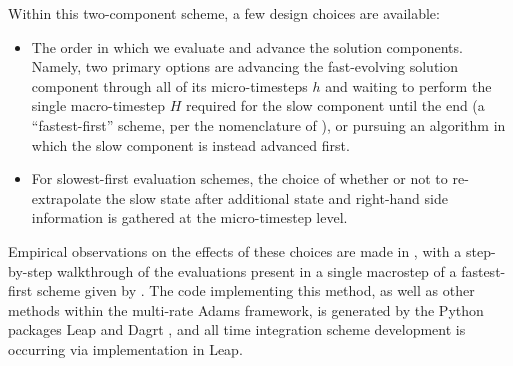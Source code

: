Within this two-component scheme, a few design choices are available:
\begin{itemize}
\item The order in which we evaluate and advance the solution components.
	Namely, two primary options are advancing the fast-evolving solution
	component through all of its micro-timesteps $h$ and waiting to perform
	the single macro-timestep $H$ required for the slow component until the
	end (a ``fastest-first'' scheme, per the nomenclature of
	\cite{gear1984multirate}), or pursuing an algorithm in which the slow
	component is instead advanced first.
\item For slowest-first evaluation schemes, the choice of whether or not to
	re-extrapolate the slow state after additional state and right-hand
	side information is gathered at the micro-timestep level.
\end{itemize}
Empirical observations on the effects of these choices are made
in \cite{klockner2010high}, with a step-by-step walkthrough of the evaluations
present in a single macrostep of a fastest-first scheme given by \cite{mikida2019multi}.
The code implementing this method, as well as other methods
within the multi-rate Adams framework, is generated by the Python packages 
Leap \cite{Leap2020} and Dagrt \cite{Dagrt2020}, and all time integration scheme
development is occurring via implementation in Leap.
